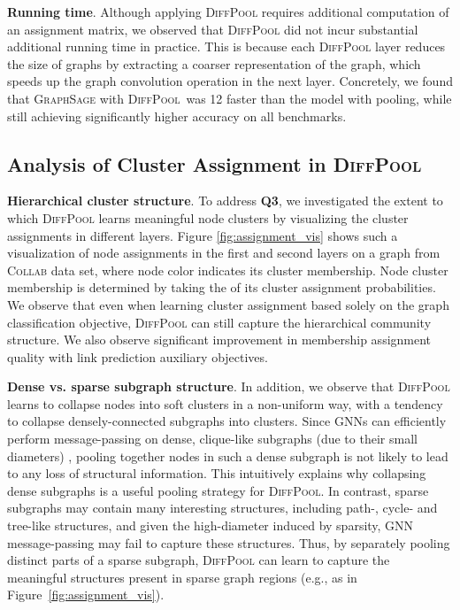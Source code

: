 \documentclass{article}
\newcommand{\xhdr}[1]{{\noindent\bfseries #1}.}
\newcommand{\name}{\textsc{DiffPool}\xspace}
\begin{document}
\xhdr{Running time} Although applying \name requires additional computation of an assignment matrix, we observed that \name did not incur substantial additional running time in practice.
This is because each \name layer reduces the size of graphs by extracting a coarser representation of the graph, which speeds up the graph convolution operation in the next layer.
Concretely, we found that \textsc{GraphSage} with \name\ was 12 faster than the  model with  pooling, while still achieving significantly higher accuracy on all benchmarks. 


\subsection{Analysis of Cluster Assignment in \name}
\label{sec:assignment_vis}

\xhdr{Hierarchical cluster structure}
To address {\bf Q3}, we investigated the extent to which \name learns meaningful node clusters by visualizing the cluster assignments in different layers. Figure \ref{fig:assignment_vis} shows such a visualization of node assignments in the first and second layers on a graph from \textsc{Collab} data set, where node color indicates its cluster membership. Node cluster membership is determined by taking the  of its cluster assignment probabilities. We observe that even when learning cluster assignment based solely on the graph classification objective, \name can still capture the hierarchical community structure. We also observe significant improvement in membership assignment quality with link prediction auxiliary objectives.

\xhdr{Dense vs. sparse subgraph structure}
In addition, we observe that \name learns to collapse nodes into soft clusters in a non-uniform way, with a tendency to collapse densely-connected subgraphs into clusters. 
Since GNNs can efficiently perform message-passing on dense, clique-like subgraphs (due to their small diameters) \cite{liao2018graph}, pooling together nodes in such a dense subgraph is not likely to lead to any loss of structural information. 
This intuitively explains why collapsing dense subgraphs is a useful pooling strategy for \name. 
In contrast, sparse subgraphs may contain many interesting structures, including path-, cycle- and tree-like structures, and given the high-diameter induced by sparsity, GNN message-passing may fail to capture these structures. 
Thus, by separately pooling distinct parts of a sparse subgraph, \name can learn to capture the meaningful structures present in sparse graph regions (e.g., as in Figure~\ref{fig:assignment_vis}). 
\end{document}

